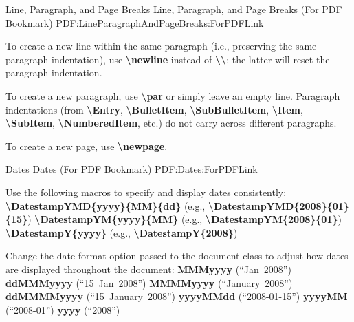 \documentclass[letterpaper,MMMyyyy,nonstopmode]{simpleresumecv}
\newcommand{\Code}[1]{\mbox{\textbf{#1}}}
\newcommand{\CodeCommand}[1]{\mbox{\textbf{\textbackslash{#1}}}}
\begin{document}
\begin{Body}
\BigGap
\SubSection
{Line, Paragraph, and Page Breaks}
{Line, Paragraph, and Page Breaks (For PDF Bookmark)}
{PDF:LineParagraphAndPageBreaks:ForPDFLink}

\Gap
\BulletItem
To create a new line within the same paragraph (i.e., preserving the same paragraph indentation), use \CodeCommand{newline} instead of \CodeCommand{\textbackslash};
the latter will reset the paragraph indentation.

\Gap
\BulletItem
To create a new paragraph, use \CodeCommand{par} or simply leave an empty line.
Paragraph indentations (from
\CodeCommand{Entry},
\CodeCommand{BulletItem},
\CodeCommand{SubBulletItem},
\CodeCommand{Item},
\CodeCommand{SubItem},
\CodeCommand{NumberedItem},
etc.) do not carry across different paragraphs.

\Gap
\BulletItem
To create a new page, use \CodeCommand{newpage}.

\BigGap
\SubSection
{Dates}
{Dates (For PDF Bookmark)}
{PDF:Dates:ForPDFLink}

\Gap
\BulletItem
Use the following macros to specify and display dates consistently:
\SubBulletItem
\CodeCommand{DatestampYMD\{yyyy\}\{MM\}\{dd\}}
(e.g., \CodeCommand{DatestampYMD\{2008\}\{01\}\{15\}})
\SubBulletItem
\CodeCommand{DatestampYM\{yyyy\}\{MM\}}
(e.g., \CodeCommand{DatestampYM\{2008\}\{01\}})
\SubBulletItem
\CodeCommand{DatestampY\{yyyy\}}
(e.g., \CodeCommand{DatestampY\{2008\}})

\Gap
\BulletItem
Change the date format option passed to the document class to adjust how dates are displayed throughout the document:
\SubBulletItem
\Code{MMMyyyy} (``Jan~2008'')
\SubBulletItem
\Code{ddMMMyyyy} (``15~Jan~2008'')
\SubBulletItem
\Code{MMMMyyyy} (``January~2008'')
\SubBulletItem
\Code{ddMMMMyyyy} (``15~January~2008'')
\SubBulletItem
\Code{yyyyMMdd} (``2008-01-15'')
\SubBulletItem
\Code{yyyyMM} (``2008-01'')
\SubBulletItem
\Code{yyyy} (``2008'')

\endgroup

\fi

\end{Body}
\end{document}
